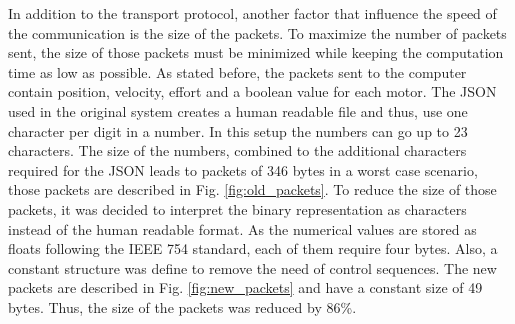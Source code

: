 {\color{green}
In addition to the transport protocol, another factor that influence the speed of the communication is the size of the packets. To maximize the number of packets sent, the size of those packets must be minimized while keeping the computation time as low as possible. As stated before, the packets sent to the computer contain position, velocity, effort and a boolean value for each motor. The JSON used in the original system creates a human readable file and thus, use one character per digit in a number. In this setup the numbers can go up to 23 characters. The size of the numbers, combined to the additional characters required for the JSON leads to packets of 346 bytes in a worst case scenario, those packets are described in Fig. \ref{fig:old_packets}. To reduce the size of those packets, it was decided to interpret the binary representation as characters instead of the human readable format. As the numerical values are stored as floats following the IEEE 754 standard\cite{IEEE_754}, each of them require four bytes. Also, a constant structure was define to remove the need of control sequences. The new packets are described in Fig. \ref{fig:new_packets} and have a constant size of 49 bytes. Thus, the size of the packets was reduced by 86\%.
}
